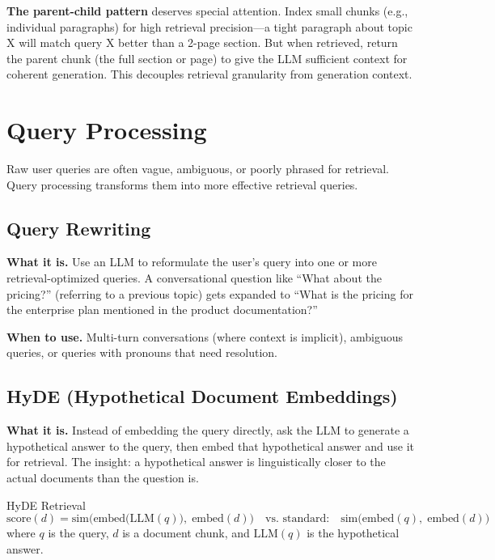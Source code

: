 \textbf{The parent-child pattern} deserves special attention. Index small chunks (e.g., individual paragraphs) for high retrieval precision---a tight paragraph about topic X will match query X better than a 2-page section. But when retrieved, return the parent chunk (the full section or page) to give the LLM sufficient context for coherent generation. This decouples retrieval granularity from generation context.

\section{Query Processing}
\label{sec:query_processing}

Raw user queries are often vague, ambiguous, or poorly phrased for retrieval. Query processing transforms them into more effective retrieval queries.

\subsection{Query Rewriting}

\textbf{What it is.} Use an LLM to reformulate the user's query into one or more retrieval-optimized queries. A conversational question like ``What about the pricing?'' (referring to a previous topic) gets expanded to ``What is the pricing for the enterprise plan mentioned in the product documentation?''

\textbf{When to use.} Multi-turn conversations (where context is implicit), ambiguous queries, or queries with pronouns that need resolution.

\subsection{HyDE (Hypothetical Document Embeddings)}

\textbf{What it is.} Instead of embedding the query directly, ask the LLM to generate a hypothetical answer to the query, then embed that hypothetical answer and use it for retrieval. The insight: a hypothetical answer is linguistically closer to the actual documents than the question is.

\begin{mathresult}{HyDE Retrieval}
\[
\text{score}(d) = \text{sim}\!\Big(\text{embed}\big(\text{LLM}(q)\big),\; \text{embed}(d)\Big) \quad \text{vs.\ standard:}\quad \text{sim}\!\big(\text{embed}(q),\; \text{embed}(d)\big)
\]
where $q$ is the query, $d$ is a document chunk, and $\text{LLM}(q)$ is the hypothetical answer.
\end{mathresult}

